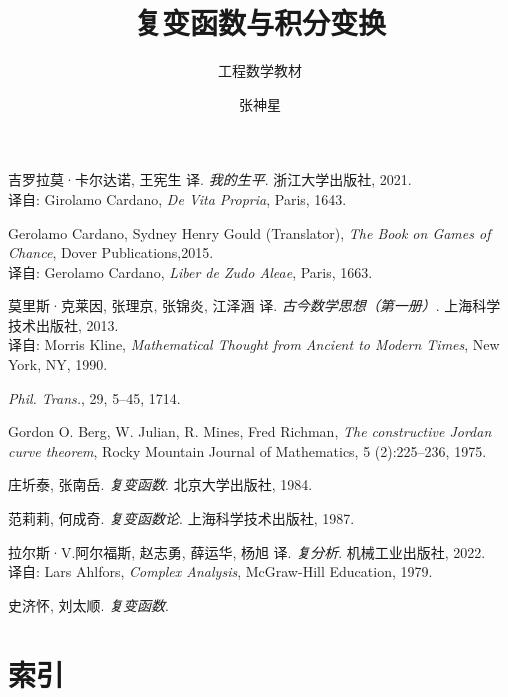 \documentclass[11pt,a4paper,twoside,openright,scheme=chinese]{ctexbook}
\title{复变函数与积分变换}
\author{张神星}
\subtitle{工程数学教材}
\begin{document}
\maketitle
\hypersetup{pageanchor=true}
\frontmatter

\mainmatter
% 
% 
% 

% 
% 
% 

% 




\begin{thebibliography}{Car43}

吉罗拉莫·卡尔达诺, 王宪生 译.
{\em 我的生平}.
浙江大学出版社, 2021.\\
译自: 
Girolamo Cardano, {\em De Vita Propria}, Paris, 1643.

Gerolamo Cardano, Sydney Henry Gould (Translator),
{\em The Book on Games of Chance}, Dover Publications,2015.\\
译自: 
Gerolamo Cardano, {\em Liber de Zudo Aleae}, Paris, 1663.


莫里斯·克莱因, 张理京, 张锦炎, 江泽涵 译.
{\em 古今数学思想（第一册）}.
上海科学技术出版社, 2013.\\
译自: 
Morris Kline, {\em Mathematical Thought from Ancient to Modern Times}, New York, NY, 1990.


{\em Phil. Trans.}, 29, 5--45, 1714.

Gordon O. Berg, W. Julian, R. Mines, Fred Richman,
{\em The constructive Jordan curve theorem},
Rocky Mountain Journal of Mathematics, 5 (2):225--236,
1975.

庄圻泰, 张南岳.
{\em 复变函数}.
北京大学出版社, 1984.

范莉莉, 何成奇.
{\em 复变函数论}.
上海科学技术出版社, 1987.

拉尔斯·V.阿尔福斯, 赵志勇, 薛运华, 杨旭 译.
{\em 复分析}.
机械工业出版社, 2022.\\
译自: 
Lars Ahlfors, {\em Complex Analysis}, McGraw-Hill Education, 1979.

史济怀, 刘太顺.
{\em 复变函数}.


\end{thebibliography}

% 

\newpage
{}
\chapter*{索\qquad 引}
\begingroup  
\begin{multicols}{2} %
\printindex %
\end{multicols}  
\endgroup  
% 
\end{document}

